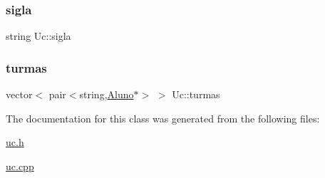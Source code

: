\subsubsection{\texorpdfstring{sigla}{sigla}}
{\footnotesize\ttfamily string Uc\+::sigla\hspace{0.3cm}{\ttfamily [protected]}}

\hypertarget{class_uc_af83cbf0a6dd978ff629bfc34d5255754}{}\label{class_uc_af83cbf0a6dd978ff629bfc34d5255754} 
\subsubsection{\texorpdfstring{turmas}{turmas}}
{\footnotesize\ttfamily vector$<$ pair$<$string,\hyperlink{class_aluno}{Aluno}$\ast$$>$ $>$ Uc\+::turmas\hspace{0.3cm}{\ttfamily [protected]}}



The documentation for this class was generated from the following files\+:\begin{DoxyCompactItemize}
\item 
\hyperlink{uc_8h}{uc.\+h}\item 
\hyperlink{uc_8cpp}{uc.\+cpp}\end{DoxyCompactItemize}
